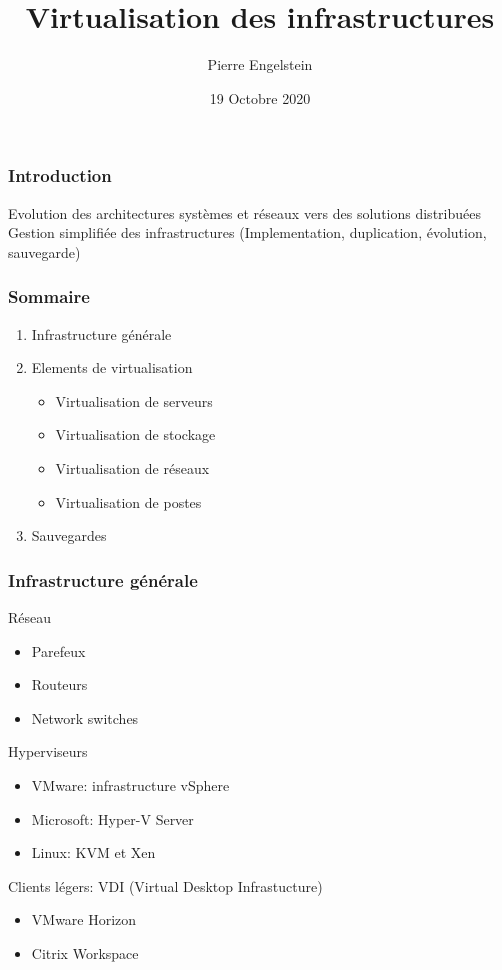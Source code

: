 \documentclass{beamer}
\title{Virtualisation des infrastructures}
\author{Pierre Engelstein}
\institute{Polytech Angers}
\date{19 Octobre 2020}
\begin{document}

\frame{\titlepage}



\begin{frame}
\frametitle{Introduction}
Evolution des architectures systèmes et réseaux vers des solutions distribuées
\medbreak
Gestion simplifiée des infrastructures (Implementation, duplication, évolution, sauvegarde)

\end{frame}


\begin{frame}
    \frametitle{Sommaire}
    
    \begin{enumerate}
        \item Infrastructure générale
        \item Elements de virtualisation
        \begin{itemize}
            \item Virtualisation de serveurs
            \item Virtualisation de stockage
            \item Virtualisation de réseaux
            \item Virtualisation de postes
        \end{itemize}
        \item Sauvegardes
    \end{enumerate}
    
    \end{frame}
    


\begin{frame}
\frametitle{Infrastructure générale}

Réseau
\begin{itemize}
    \item Parefeux
    \item Routeurs
    \item Network switches
\end{itemize}

Hyperviseurs
\begin{itemize}
    \item VMware: infrastructure vSphere
    \item Microsoft: Hyper-V Server
    \item Linux: KVM et Xen
\end{itemize}

Clients légers: VDI (Virtual Desktop Infrastucture)
\begin{itemize}
    \item VMware Horizon
    \item Citrix Workspace
\end{itemize}

\end{frame}
    
\end{document}

